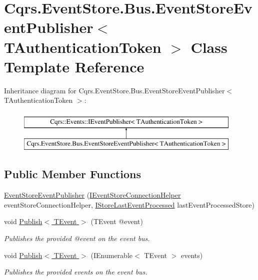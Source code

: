 \hypertarget{classCqrs_1_1EventStore_1_1Bus_1_1EventStoreEventPublisher}{}\section{Cqrs.\+Event\+Store.\+Bus.\+Event\+Store\+Event\+Publisher$<$ T\+Authentication\+Token $>$ Class Template Reference}
\label{classCqrs_1_1EventStore_1_1Bus_1_1EventStoreEventPublisher}
Inheritance diagram for Cqrs.\+Event\+Store.\+Bus.\+Event\+Store\+Event\+Publisher$<$ T\+Authentication\+Token $>$\+:\begin{figure}[H]
\begin{center}
\leavevmode
\includegraphics[height=2.000000cm]{classCqrs_1_1EventStore_1_1Bus_1_1EventStoreEventPublisher}
\end{center}
\end{figure}
\subsection*{Public Member Functions}
\begin{DoxyCompactItemize}
\item 
\hyperlink{classCqrs_1_1EventStore_1_1Bus_1_1EventStoreEventPublisher_a4ca16479fe387fae0135865ae3f889d7}{Event\+Store\+Event\+Publisher} (\hyperlink{interfaceCqrs_1_1EventStore_1_1IEventStoreConnectionHelper}{I\+Event\+Store\+Connection\+Helper} event\+Store\+Connection\+Helper, \hyperlink{interfaceCqrs_1_1Bus_1_1IStoreLastEventProcessed}{I\+Store\+Last\+Event\+Processed} last\+Event\+Processed\+Store)
\item 
void \hyperlink{classCqrs_1_1EventStore_1_1Bus_1_1EventStoreEventPublisher_a1ebb6f08648bdfd5c5bd29fcc12adfea}{Publish$<$ T\+Event $>$} (T\+Event @event)
\begin{DoxyCompactList}\small\item\em Publishes the provided {\itshape @event}  on the event bus. \end{DoxyCompactList}\item 
void \hyperlink{classCqrs_1_1EventStore_1_1Bus_1_1EventStoreEventPublisher_a85b4922ff01b088b01b39463681c6eb6}{Publish$<$ T\+Event $>$} (I\+Enumerable$<$ T\+Event $>$ events)
\begin{DoxyCompactList}\small\item\em Publishes the provided {\itshape events}  on the event bus. \end{DoxyCompactList}\end{DoxyCompactItemize}
